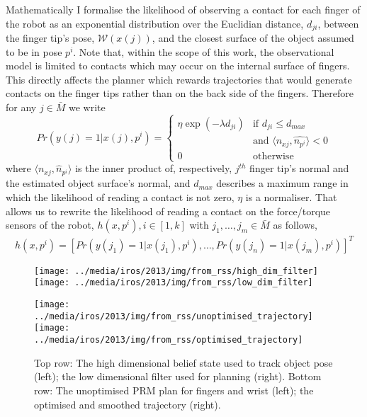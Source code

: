 Mathematically I formalise the likelihood of observing a contact for each finger of the robot as an exponential distribution over the Euclidian distance, $d_{ji}$, between the finger tip's pose, $\mathcal{W}(x(j))$, and the closest surface of the object assumed to be in pose $p^i$. Note that, within the scope of this work,  the observational model is limited to contacts which may occur on the internal surface of fingers. This directly affects the planner which rewards trajectories that would generate contacts on the finger tips rather than on the back side of the fingers.
Therefore for any $j\in\bar{M}$ we write
$$
Pr(y(j)=1|x(j), p^i)=
\begin{cases}
  \eta\exp(-\lambda d_{ji}) & \text{if }d_{ji}\leq d_{max} \\
	& \text{and }\langle n_{xj},\hat{n_{p^i}}\rangle < 0 \\
  0 & \text{otherwise}
\end{cases}
$$
where $\langle n_{xj},\hat{n}_{p^i}\rangle$ is the inner product of, respectively, $j^{th}$ finger tip's normal and the estimated object surface's normal, and $d_{max}$ describes a maximum range in which the likelihood of reading a contact is not zero, $\eta$ is a normaliser. That allows us to rewrite the likelihood of reading a contact on the force/torque sensors of the robot, $h(x,p^i),i\in[1,k]$ with $j_1,\ldots,j_m\in\bar{M}$ as follows,
$$
\begin{aligned}
h(x,p^i)=[Pr(y(j_1)=1|x(j_1),p^i),\dots,Pr(y(j_n)=1|x(j_m),p^i)]^T
\end{aligned}
$$

\begin{figure}[!t]
\centerline{
\texttt{[image: ../media/iros/2013/img/from\_rss/high\_dim\_filter]}
\texttt{[image: ../media/iros/2013/img/from\_rss/low\_dim\_filter]}
}
\vspace{0.8mm}
\centerline{
\texttt{[image: ../media/iros/2013/img/from\_rss/unoptimised\_trajectory]}
\texttt{[image: ../media/iros/2013/img/from\_rss/optimised\_trajectory]}
}
\caption[IG planner for dexterous grasping]{Top row: The high dimensional belief state used to track object pose (left); the low dimensional filter used for planning (right). Bottom row: The unoptimised PRM plan for fingers and wrist (left); the optimised and smoothed trajectory (right).}
\label{fig:spam.plan.example}
\end{figure}

